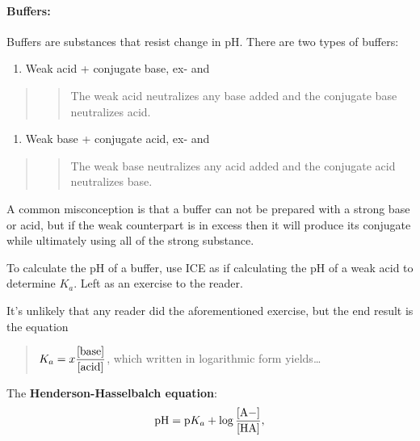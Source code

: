\documentclass[]{article}
\providecommand{\tightlist}{%
  \setlength{\itemsep}{0pt}\setlength{\parskip}{0pt}}
\let\oldparagraph\paragraph
\renewcommand{\paragraph}[1]{\oldparagraph{#1}\mbox{}}
\begin{document}
\paragraph{Buffers:}\label{buffers}

Buffers are substances that resist change in pH. There are two types of
buffers:

\begin{enumerate}
\def\labelenumi{\arabic{enumi}.}
\tightlist
\item
  Weak acid + conjugate base, ex- and 
\end{enumerate}

\begin{quote}
\begin{quote}
The weak acid neutralizes any base added and the conjugate base
neutralizes acid.
\end{quote}
\end{quote}

\begin{enumerate}
\def\labelenumi{\arabic{enumi}.}
\setcounter{enumi}{1}
\tightlist
\item
  Weak base + conjugate acid, ex- and 
\end{enumerate}

\begin{quote}
\begin{quote}
The weak base neutralizes any acid added and the conjugate acid
neutralizes base.
\end{quote}
\end{quote}

A common misconception is that a buffer can not be prepared with a
strong base or acid, but if the weak counterpart is in excess then it
will produce its conjugate while ultimately using all of the strong
substance.

To calculate the pH of a buffer, use ICE as if calculating the pH of a
weak acid to determine \(K_a\). Left as an exercise to the reader.

\newpage 

It's unlikely that any reader did the aforementioned exercise, but the
end result is the equation

\begin{quote}
\(K_a = x\dfrac{\text{\lbrack base\rbrack }}{\text{\lbrack acid\rbrack }}\),
which written in logarithmic form yields\ldots{}
\end{quote}

The \textbf{Henderson-Hasselbalch equation}:
\[\text{pH} = \text{p}K_a + \log{\dfrac{\ce{\lbrack A-\rbrack }}{\ce{\lbrack HA\rbrack }}},\]
\end{document}
